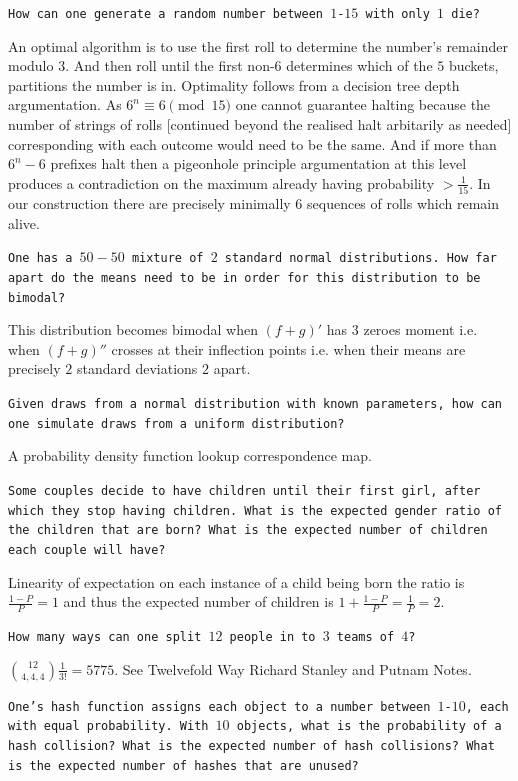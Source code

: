 \texttt{How can one generate a random number between $1$-$15$ with only $1$ die?}

An optimal algorithm is to use the first roll to determine the number's remainder modulo $3$. And then roll until the first non-$6$ determines which of the $5$ buckets, partitions the number is in. Optimality follows from a decision tree depth argumentation. As $ 6^n \equiv 6 \pmod{15}$ one cannot guarantee halting because the number of strings of rolls [continued beyond the realised halt arbitarily as needed] corresponding with each outcome would need to be the same. And if more than $6^n-6$ prefixes halt then a pigeonhole principle argumentation at this level produces a contradiction on the maximum already having probability $> \frac{1}{15}$. In our construction there are precisely minimally $6$ sequences of rolls which remain alive.

\texttt{One has a $50-50$ mixture of $2$ standard normal distributions. How far apart do the means need to be in order for this distribution to be bimodal?}

This distribution becomes bimodal when $(f+g)'$ has $3$ zeroes moment i.e. when $(f+g)''$ crosses at their inflection points i.e. when their means are precisely $2$ standard deviations $\boxed{2}$ apart.

\texttt{Given draws from a normal distribution with known parameters, how can one simulate draws from a uniform distribution?}

A probability density function lookup correspondence map.

\texttt{Some couples decide to have children until their first girl, after which they stop having children. What is the expected gender ratio of the children that are born? What is the expected number of children each couple will have?}

Linearity of expectation on each instance of a child being born the ratio is $\frac{1-P}{P}=\boxed{1}$ and thus the expected number of children is $1+\frac{1-P}{P}=\frac{1}{P}=\boxed{2}$.

\texttt{How many ways can one split $12$ people in to $3$ teams of $4$?}

$ \binom{12}{4,4,4} \frac{1}{3!} = \boxed{5775}$. See Twelvefold Way Richard Stanley and Putnam Notes.

\texttt{One's hash function assigns each object to a number between $1$-$10$, each with equal probability. With $10$ objects, what is the probability of a hash collision? What is the expected number of hash collisions? What is the expected number of hashes that are unused?}

